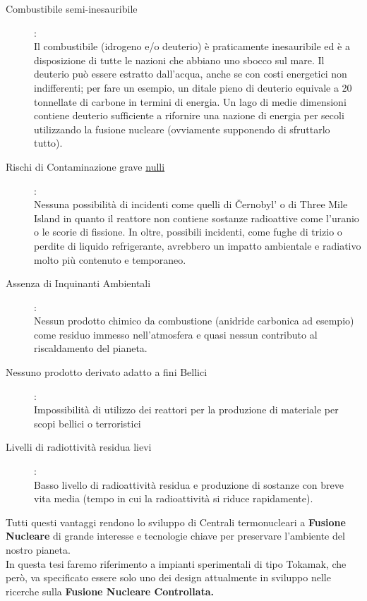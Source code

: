 \begin{description}
	\item [Combustibile semi-inesauribile]:\\
	      Il combustibile (idrogeno e/o deuterio) è praticamente inesauribile ed è a disposizione di tutte le nazioni che abbiano uno sbocco sul mare. Il deuterio può essere estratto dall'acqua, anche se con costi energetici non indifferenti; per fare un esempio, un ditale pieno di deuterio equivale a 20 tonnellate di carbone in termini di energia. Un lago di medie dimensioni contiene deuterio sufficiente a rifornire una nazione di energia per secoli utilizzando la fusione nucleare (ovviamente supponendo di sfruttarlo tutto).
	\item [Rischi di Contaminazione grave \underline{nulli}]:\\
	      Nessuna possibilità di incidenti come quelli di Černobyl' o di Three Mile Island in quanto il reattore non contiene sostanze radioattive come l'uranio o le scorie di fissione. In oltre, possibili incidenti, come fughe di trizio o perdite di liquido refrigerante, avrebbero un impatto ambientale e radiativo molto più contenuto e temporaneo.
	\item [Assenza di Inquinanti Ambientali]:\\
	      Nessun prodotto chimico da combustione (anidride carbonica ad esempio) come residuo immesso nell'atmosfera e quasi nessun contributo al riscaldamento del pianeta.
	\item [Nessuno prodotto derivato adatto a fini Bellici]:\\
	      Impossibilità di utilizzo dei reattori per la produzione di materiale per scopi bellici o terroristici
	\item [Livelli di radiottività residua lievi]:\\
	      Basso livello di radioattività residua e produzione di sostanze con breve vita media (tempo in cui la radioattività si riduce rapidamente).
\end{description}
\noindent
Tutti questi vantaggi rendono lo sviluppo di Centrali termonucleari a \textbf{Fusione Nucleare} di grande interesse e tecnologie chiave per preservare l'ambiente del nostro pianeta.\\
In questa tesi faremo riferimento a impianti sperimentali di tipo Tokamak, che però, va specificato essere solo uno dei design attualmente in sviluppo nelle ricerche sulla \textbf{Fusione Nucleare Controllata.}
\newpage

